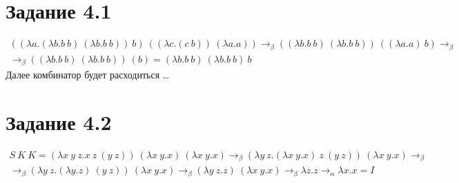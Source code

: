 \documentclass[16pt]{article}
\begin{document}
\section*{Задание 4.1}

\begin{eqnarray*}
((\lambda a.(\lambda b.b\ b)\ (\lambda b.b\ b))\ b)\ ((\lambda c.(c\ b))\ (\lambda a.a)) \rightarrow_\beta ((\lambda b.b\ b)\ (\lambda b. b\ b))\ ((\lambda a.a)\ b) \rightarrow_\beta  \\ \rightarrow_\beta ((\lambda b.b\ b)\ (\lambda b.b\ b))\ (b) = (\lambda b.b\ b)\ (\lambda b.b\ b)\ b
\end{eqnarray*}
Далее комбинатор будет расходиться \ldots

\section*{Задание 4.2}

\begin{eqnarray*}
S\ K\ K = (\lambda x\ y\ z.x\ z\ (y\ z))\ (\lambda x\ y.x)\ (\lambda x\ y.x) \rightarrow_\beta (\lambda y\ z.(\lambda x\ y.x)\ z\ (y\ z))\ (\lambda x\ y.x) \rightarrow_\beta \\ \rightarrow_\beta (\lambda y\ z.(\lambda y.z)\ (y\ z))\ (\lambda x\ y.x) \rightarrow_\beta (\lambda y\ z.z)\ (\lambda x\ y.x) \rightarrow_\beta \lambda z.z \rightarrow_\alpha \lambda x.x = I
\end{eqnarray*}
\end{document}
